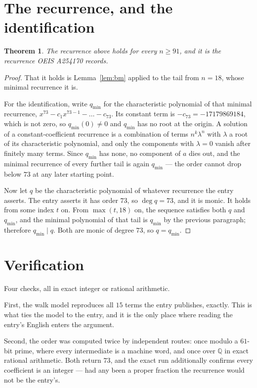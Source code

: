 \documentclass[11pt,a4paper]{article}
\theoremstyle{plain}
\newtheorem{theorem}{Theorem}
\theoremstyle{definition}
\begin{document}
\section{The recurrence, and the identification}

\begin{theorem}
The recurrence above holds for every $n\ge91$, and it is the recurrence OEIS A254170 records.
\end{theorem}

\begin{proof}
That it holds is Lemma~\ref{lem:bm} applied to the tail from $n=18$, whose minimal
recurrence it is.

For the identification, write $q_{\min}$ for the characteristic polynomial of that minimal
recurrence, $x^{73}-c_1x^{73-1}-\dots-c_{73}$. Its constant term is
$-c_{73}=-17179869184$, which is not zero, so $q_{\min}(0)\neq0$ and $q_{\min}$ has no
root at the origin. A solution of a constant-coefficient recurrence is a combination of terms
$n^{k}\lambda^{n}$ with $\lambda$ a root of its characteristic polynomial, and only the
components with $\lambda=0$ vanish after finitely many terms. Since $q_{\min}$ has none, no
component of $a$ dies out, and the minimal recurrence of every further tail is again
$q_{\min}$ --- the order cannot drop below $73$ at any later starting point.

Now let $q$ be the characteristic polynomial of whatever recurrence the entry asserts. The
entry asserts it has order $73$, so $\deg q=73$, and it is monic. It holds from some
index $t$ on. From $\max(t,18)$ on, the sequence satisfies both $q$ and $q_{\min}$, and
the minimal polynomial of that tail is $q_{\min}$ by the previous paragraph; therefore
$q_{\min}\mid q$. Both are monic of degree $73$, so $q=q_{\min}$.
\end{proof}

\section{Verification}

Four checks, all in exact integer or rational arithmetic.

First, the walk model reproduces all $15$ terms the entry publishes, exactly. This is
what ties the model to the entry, and it is the only place where reading the entry's English
enters the argument.

Second, the order was computed twice by independent routes: once modulo a $61$-bit prime, where
every intermediate is a machine word, and once over $\mathbb{Q}$ in exact rational arithmetic.
Both return $73$, and the exact run additionally confirms every coefficient is an integer
--- had any been a proper fraction the recurrence would not be the entry's.
\end{document}

